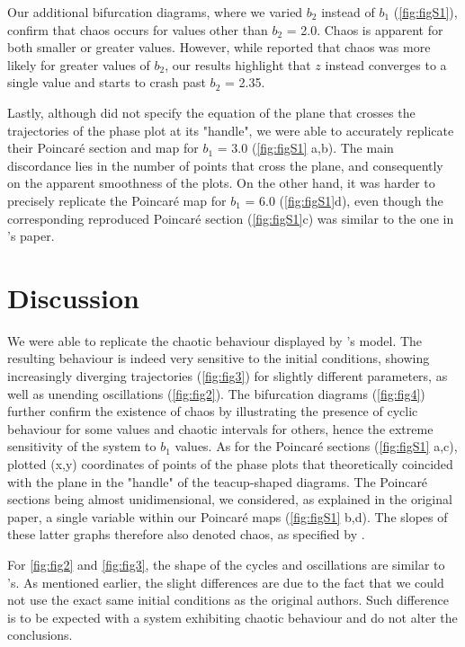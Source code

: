 Our additional bifurcation diagrams, where we varied $b_2$ instead of $b_1$ (\autoref{fig:figS1}),
confirm that chaos occurs for values other than $b_2$ = 2.0. Chaos is apparent for both
smaller or greater values.
However, while \citeauthor{hastings1991} reported that chaos was more likely for greater values of
$b_2$, our results highlight that $z$ instead converges to a single value and starts to
crash past $b_2$ = 2.35.

Lastly, although \citeauthor{hastings1991} did not specify the equation of the plane that
crosses the trajectories of the phase plot at its "handle", we were able to accurately
replicate their Poincaré section and map for $b_1$ = 3.0 (\autoref{fig:figS1} a,b). The main
discordance lies in the number of points that cross the plane, and consequently on the
apparent smoothness of the plots.
On the other hand, it was harder to precisely replicate the Poincaré map for $b_1$ = 6.0
(\autoref{fig:figS1}d), even though the corresponding reproduced Poincaré section (\autoref{fig:figS1}c)
was similar to the one in \citeauthor{hastings1991}'s paper.

\section{Discussion}

We were able to replicate the chaotic behaviour displayed by \citeauthor{hastings1991}'s model.
The resulting behaviour is indeed very sensitive to the initial conditions, showing
increasingly diverging trajectories (\autoref{fig:fig3}) for slightly different parameters, as well
as unending oscillations (\autoref{fig:fig2}). The bifurcation diagrams (\autoref{fig:fig4}) further confirm
the existence of chaos by illustrating the presence of cyclic behaviour for some values
and chaotic intervals for others, hence the extreme sensitivity of the system to $b_1$
values. As for the Poincaré sections (\autoref{fig:figS1} a,c), \citeauthor{hastings1991} plotted (x,y)
coordinates of points of the phase plots that theoretically coincided with the plane in
the "handle" of the teacup-shaped diagrams.
The Poincaré sections being almost unidimensional, we considered, as explained in the
original paper, a single variable within our Poincaré maps (\autoref{fig:figS1} b,d). The slopes
of these latter graphs therefore also denoted chaos, as specified by \citeauthor{hastings1991}.

For \autoref{fig:fig2} and \autoref{fig:fig3}, the shape of the cycles and oscillations are similar to
\citeauthor{hastings1991}'s.
As mentioned earlier, the slight differences are due to the fact that we could not use the
exact same initial conditions as the original authors.
Such difference is to be expected with a system exhibiting chaotic behaviour and do not
alter the conclusions.

